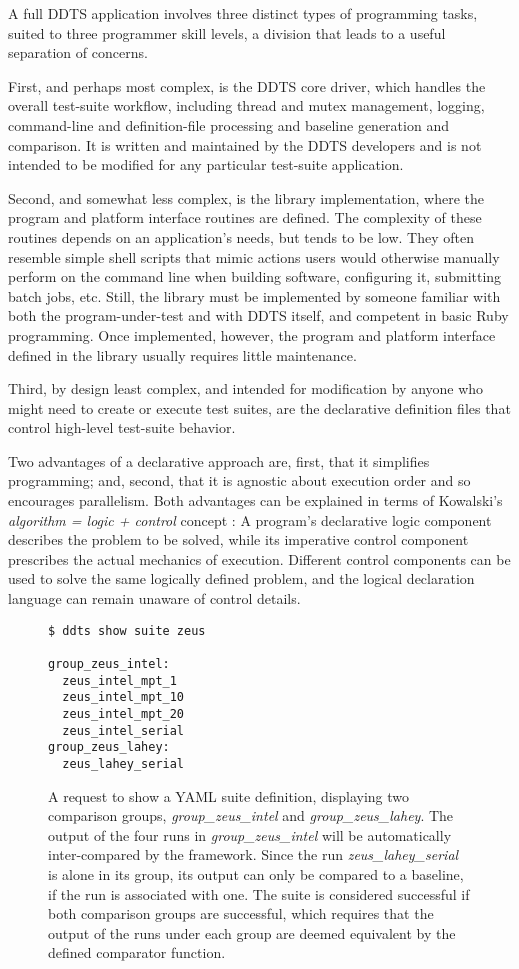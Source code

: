 \documentclass[conference]{IEEEtran}
\begin{document}
A full DDTS application involves three distinct types of programming tasks, suited to three programmer skill levels, a division that leads to a useful separation of concerns.

First, and perhaps most complex, is the DDTS core driver, which handles the overall test-suite workflow, including thread and mutex management, logging, command-line and definition-file processing and baseline generation and comparison. It is written and maintained by the DDTS developers and is not intended to be modified for any particular test-suite application.

Second, and somewhat less complex, is the library implementation, where the program and platform interface routines are defined. The complexity of these routines depends on an application's needs, but tends to be low. They often resemble simple shell scripts that mimic actions users would otherwise manually perform on the command line when building software, configuring it, submitting batch jobs, etc. Still, the library must be implemented by someone familiar with both the program-under-test and with DDTS itself, and competent in basic Ruby programming. Once implemented, however, the program and platform interface defined in the library usually requires little maintenance.

Third, by design least complex, and intended for modification by anyone who might need to create or execute test suites, are the declarative definition files that control high-level test-suite behavior.

Two advantages of a declarative approach are, first, that it simplifies programming; and, second, that it is agnostic about execution order and so encourages parallelism. Both advantages can be explained in terms of Kowalski's \emph{algorithm = logic + control} concept \cite{logic-control}: A program's declarative logic component describes the problem to be solved, while its imperative control component prescribes the actual mechanics of execution. Different control components can be used to solve the same logically defined problem, and the logical declaration language can remain unaware of control details.

\begin{figure}[!t]
{\small \begin{verbatim}
$ ddts show suite zeus

group_zeus_intel: 
  zeus_intel_mpt_1
  zeus_intel_mpt_10
  zeus_intel_mpt_20
  zeus_intel_serial
group_zeus_lahey: 
  zeus_lahey_serial
\end{verbatim} }
\caption{A request to show a YAML suite definition, displaying two comparison groups, \emph{group\_zeus\_intel} and \emph{group\_zeus\_lahey}. The output of the four runs in \emph{group\_zeus\_intel} will be automatically inter-compared by the framework. Since the run \emph{zeus\_lahey\_serial} is alone in its group, its output can only be compared to a baseline, if the run is associated with one. The suite is considered successful if both comparison groups are successful, which requires that the output of the runs under each group are deemed equivalent by the defined comparator function.}
\label{figure:2}
\end{figure}
\end{document}
